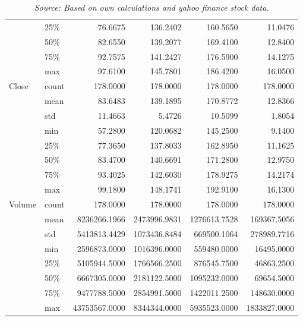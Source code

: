 \documentclass[review]{elsarticle} %
\begin{document}
\begin{table}[hbt!]
\begin{tabular}{llrrrr}
       & 25\% &       76.6675 &     136.2402 &     160.5650 &      11.0476 \\
       & 50\% &       82.6550 &     139.2077 &     169.4100 &      12.8400 \\
       & 75\% &       92.7575 &     141.2427 &     176.5900 &      14.1275 \\
       & max &       97.6100 &     145.7801 &     186.4200 &      16.0500 \\
Close & count &      178.0000 &     178.0000 &     178.0000 &     178.0000 \\
       & mean &       83.6483 &     139.1895 &     170.8772 &      12.8366 \\
       & std &       11.4663 &       5.4726 &      10.5099 &       1.8054 \\
       & min &       57.2800 &     120.0682 &     145.2500 &       9.1400 \\
       & 25\% &       77.3650 &     137.8033 &     162.8950 &      11.1625 \\
       & 50\% &       83.4700 &     140.6691 &     171.2800 &      12.9750 \\
       & 75\% &       93.4025 &     142.6030 &     178.9275 &      14.2174 \\
       & max &       99.1800 &     148.1741 &     192.9100 &      16.1300 \\
Volume & count &      178.0000 &     178.0000 &     178.0000 &     178.0000 \\
       & mean &  8236266.1966 & 2473996.9831 & 1276613.7528 &  169367.5056 \\
       & std &  5413813.4429 & 1073436.8484 &  669500.1064 &  278989.7716 \\
       & min &  2596873.0000 & 1016396.0000 &  559480.0000 &   16495.0000 \\
       & 25\% &  5105944.5000 & 1766566.2500 &  876545.7500 &   46863.2500 \\
       & 50\% &  6667305.0000 & 2181122.5000 & 1095232.0000 &   69654.5000 \\
       & 75\% &  9477788.5000 & 2854991.5000 & 1422011.2500 &  148630.0000 \\
       & max & 43753567.0000 & 8344344.0000 & 5935523.0000 & 1833827.0000 \\
\bottomrule
\end{tabular}
\caption*{\textit{Source: Based on own calculations and yahoo finance stock data.}}
\end{table}

\clearpage
\end{document}
